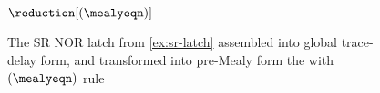 \begin{figure}
    \centering
    \(\reduction[(\mealyeqn)]\)
    \caption{
        The SR NOR latch from \cref{ex:sr-latch} assembled into global
        trace-delay form, and transformed into pre-Mealy form the with
        \((\mealyeqn)\) rule
    }
    \label{fig:sr-latch-global-trace-delay}
\end{figure}